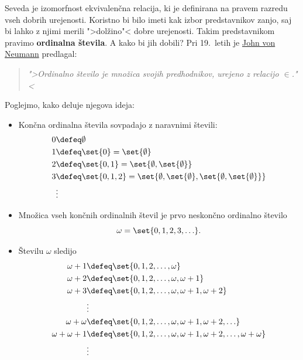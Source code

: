 Seveda je izomorfnost ekvivalenčna relacija, ki je definirana na pravem razredu vseh dobrih urejenosti. 
Koristno bi bilo imeti kak izbor predstavnikov zanjo, saj bi lahko z njimi merili ">dolžino"< dobre urejenosti. Takim predstavnikom pravimo \textbf{ordinalna števila}. A kako bi jih dobili? Pri 19.~letih je \href{https://en.wikipedia.org/wiki/John_von_Neumann}{John von Neumann} predlagal:
%
\begin{quote}
  \emph{">Ordinalno število je množica svojih predhodnikov, urejeno z relacijo $\in$."<}
\end{quote}
%
Poglejmo, kako deluje njegova ideja:
%
\begin{itemize}

\item Končna ordinalna števila sovpadajo z naravnimi števili:
  \begin{align*}
    0 &\defeq \emptyset \\
    1 &\defeq \set{0} = \set{\emptyset} \\
    2 &\defeq \set{0, 1} = \set{\emptyset, \set{\emptyset}} \\
    3 &\defeq \set{0, 1, 2} = \set{\emptyset, \set{\emptyset}, \set{\emptyset, \set{\emptyset}}} \\
      &\vdots
  \end{align*}

\item Množica vseh končnih ordinalnih števil je prvo neskončno ordinalno število
  \begin{equation*}
    \omega = \set{0, 1, 2, 3, \ldots}.
  \end{equation*}

\item Številu $\omega$ sledijo
  \begin{align*}
    \omega + 1 &\defeq \set{0, 1, 2, \ldots, \omega} \\
    \omega + 2 &\defeq \set{0, 1, 2, \ldots, \omega, \omega + 1} \\
    \omega + 3 &\defeq \set{0, 1, 2, \ldots, \omega, \omega + 1, \omega + 2} \\
               &\vdots \\
    \omega + \omega &\defeq \set{0, 1, 2, \ldots, \omega, \omega + 1, \omega + 2, \ldots} \\
    \omega + \omega + 1 &\defeq \set{0, 1, 2, \ldots, \omega, \omega + 1, \omega + 2, \ldots, \omega + \omega} \\
               &\vdots
  \end{align*}
\end{itemize}


